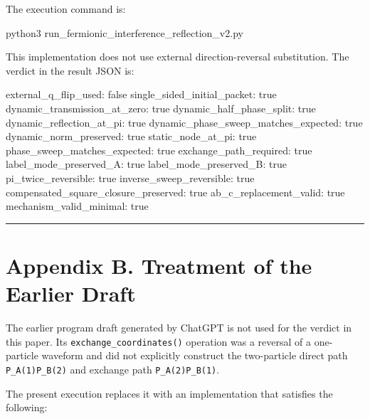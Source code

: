 \documentclass[
  a4paper,
]{article}
\newenvironment{Shaded}{}{}
\newcommand{\NormalTok}[1]{#1}
\begin{document}
The execution command is:

\begin{Shaded}
\begin{Highlighting}[]
\NormalTok{python3 run\_fermionic\_interference\_reflection\_v2.py}
\end{Highlighting}
\end{Shaded}

This implementation does not use external direction-reversal
substitution. The verdict in the result JSON is:

\begin{Shaded}
\begin{Highlighting}[]
\NormalTok{external\_q\_flip\_used: false}
\NormalTok{single\_sided\_initial\_packet: true}
\NormalTok{dynamic\_transmission\_at\_zero: true}
\NormalTok{dynamic\_half\_phase\_split: true}
\NormalTok{dynamic\_reflection\_at\_pi: true}
\NormalTok{dynamic\_phase\_sweep\_matches\_expected: true}
\NormalTok{dynamic\_norm\_preserved: true}
\NormalTok{static\_node\_at\_pi: true}
\NormalTok{phase\_sweep\_matches\_expected: true}
\NormalTok{exchange\_path\_required: true}
\NormalTok{label\_mode\_preserved\_A: true}
\NormalTok{label\_mode\_preserved\_B: true}
\NormalTok{pi\_twice\_reversible: true}
\NormalTok{inverse\_sweep\_reversible: true}
\NormalTok{compensated\_square\_closure\_preserved: true}
\NormalTok{ab\_c\_replacement\_valid: true}
\NormalTok{mechanism\_valid\_minimal: true}
\end{Highlighting}
\end{Shaded}

\begin{center}\rule{0.5\linewidth}{0.5pt}\end{center}

\section{Appendix B. Treatment of the Earlier
Draft}\label{appendix-b.-treatment-of-the-earlier-draft}

The earlier program draft generated by ChatGPT is not used for the
verdict in this paper. Its \texttt{exchange\_coordinates()} operation
was a reversal of a one-particle waveform and did not explicitly
construct the two-particle direct path \texttt{P\_A(1)P\_B(2)} and
exchange path \texttt{P\_A(2)P\_B(1)}.

The present execution replaces it with an implementation that satisfies
the following:
\end{document}

